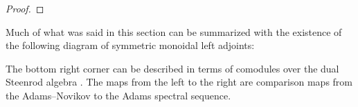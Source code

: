 \begin{proof}
\end{proof}


Much of what was said in this section can be summarized with the existence of the following diagram of symmetric monoidal left adjoints:

\begin{center}
\end{center}

The bottom right corner can be described in terms of comodules over the dual Steenrod algebra \cite[Section 4.5]{Pstragowski}.  The maps from the left to the right are comparison maps from the Adams--Novikov to the Adams spectral sequence.


